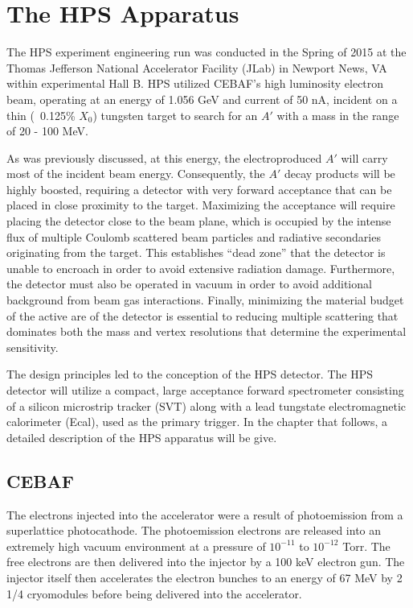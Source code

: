 
\chapter{The HPS Apparatus}

The HPS experiment engineering run was conducted in the Spring of 2015 at the 
Thomas Jefferson National Accelerator Facility (JLab) in Newport News, VA 
within experimental Hall B.  HPS utilized CEBAF's high luminosity electron beam,
operating at an energy of 1.056 GeV and current of 50 nA, incident on a thin
(~0.125\% $X_{0}$) tungsten target to search for an $A'$ with a mass in the 
range of 20 - 100 MeV.  

As was previously discussed, at this energy, the electroproduced $A'$ will 
carry most of the incident beam energy.  Consequently, the $A'$ decay products
will be highly boosted, requiring a detector with very forward acceptance that
can be placed in close proximity to the target.  Maximizing the acceptance will
require placing the detector close to the beam plane, which is occupied by the
intense flux of multiple Coulomb scattered beam particles and radiative
secondaries originating from the target.  This establishes  ``dead zone'' that
the detector is unable to encroach in order to avoid extensive radiation damage.
Furthermore, the detector must also be operated in vacuum in order to avoid 
additional background from beam gas interactions.  Finally, minimizing the 
material budget of the active are of the detector is essential to reducing 
multiple scattering that dominates both the mass and vertex resolutions that 
determine the experimental sensitivity.

The design principles led to the conception of the HPS detector.  The HPS 
detector will utilize a compact, large acceptance forward spectrometer 
consisting of a silicon microstrip tracker (SVT) along with a lead tungstate
electromagnetic calorimeter (Ecal), used as the primary trigger.  In the chapter
that follows, a detailed description of the HPS apparatus will be give.

\section{CEBAF}

The electrons injected into the accelerator were a result of photoemission from
a superlattice photocathode.  The photoemission electrons are released into an
extremely high vacuum environment at a pressure of $10^{-11}$ to $10^{-12}$ 
Torr.  The free electrons are then delivered into the injector by a 100 keV 
electron gun.  The injector itself then accelerates the electron bunches to 
an energy of 67 MeV by 2 1/4 cryomodules before being delivered into the 
accelerator.  

